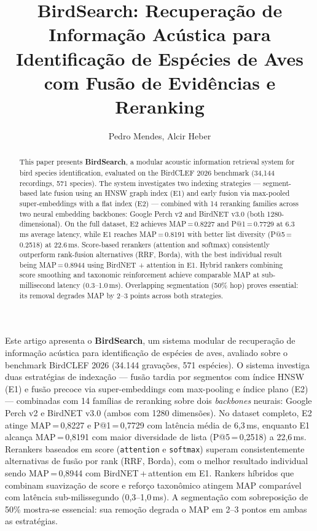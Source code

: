 \documentclass[12pt]{article}
\title{BirdSearch: Recuperação de Informação Acústica para\\ Identificação
de Espécies de Aves com Fusão de Evidências e Reranking}
\author{Pedro Mendes\inst{1}, Alcir Heber\inst{1}}
\begin{document}
\maketitle

\begin{abstract}
This paper presents \textbf{BirdSearch}, a modular acoustic information
retrieval system for bird species identification, evaluated on the BirdCLEF
2026 benchmark (34,144 recordings, 571 species). The system investigates two
indexing strategies --- segment-based late fusion using an HNSW graph index
(E1) and early fusion via max-pooled super-embeddings with a flat index (E2)
--- combined with 14 reranking families across two neural embedding backbones:
Google Perch v2 and BirdNET v3.0 (both 1280-dimensional). On the full dataset,
E2 achieves MAP\,=\,0.8227 and P@1\,=\,0.7729 at 6.3\,ms average latency,
while E1 reaches MAP\,=\,0.8191 with better list diversity (P@5\,=\,0.2518)
at 22.6\,ms. Score-based rerankers (attention and softmax) consistently
outperform rank-fusion alternatives (RRF, Borda), with the best individual
result being MAP\,=\,0.8944 using BirdNET + attention in E1. Hybrid rankers
combining score smoothing and taxonomic reinforcement achieve comparable MAP
at sub-millisecond latency (0.3--1.0\,ms). Overlapping segmentation (50\%
hop) proves essential: its removal degrades MAP by 2--3 points across both
strategies.
\end{abstract}

\begin{resumo}
Este artigo apresenta o \textbf{BirdSearch}, um sistema modular de recuperação
de informação acústica para identificação de espécies de aves, avaliado sobre
o benchmark BirdCLEF 2026 (34.144 gravações, 571 espécies). O sistema investiga
duas estratégias de indexação --- fusão tardia por segmentos com índice HNSW
(E1) e fusão precoce via super-embeddings com max-pooling e índice plano (E2)
--- combinadas com 14 famílias de reranking sobre dois \textit{backbones}
neurais: Google Perch v2 e BirdNET v3.0 (ambos com 1280 dimensões). No dataset
completo, E2 atinge MAP\,=\,0,8227 e P@1\,=\,0,7729 com latência média de
6,3\,ms, enquanto E1 alcança MAP\,=\,0,8191 com maior diversidade de lista
(P@5\,=\,0,2518) a 22,6\,ms. Rerankers baseados em score (\texttt{attention}
e \texttt{softmax}) superam consistentemente alternativas de fusão por rank
(RRF, Borda), com o melhor resultado individual sendo MAP\,=\,0,8944 com
BirdNET\,+\,attention em E1. Rankers híbridos que combinam suavização de score
e reforço taxonômico atingem MAP comparável com latência sub-milissegundo
(0,3--1,0\,ms). A segmentação com sobreposição de 50\% mostra-se essencial:
sua remoção degrada o MAP em 2--3 pontos em ambas as estratégias.
\end{resumo}
\end{document}
